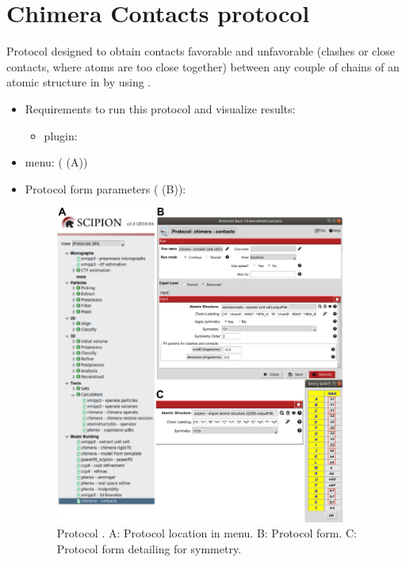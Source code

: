 \section{Chimera Contacts protocol}
\label{app:chimeraContactsProtocol}%

Protocol designed to obtain contacts favorable and unfavorable (clashes or close contacts, where atoms are too close together) between any couple of chains of an atomic structure in \scipion by using \chimera. 

 \begin{itemize}
  \item Requirements to run this protocol and visualize results:
    \begin{itemize}
        \item \scipion plugin: 
    \end{itemize}
  \item \scipion menu:
    ( (A))
  
  \item Protocol form parameters ( (B)):
  
  \begin{figure}[H]
     \centering 
     \captionsetup{width=.7\linewidth} 
     \includegraphics[width=0.90\textwidth]{Images_appendix/Fig155.pdf}
     \caption{Protocol . A: Protocol location in \scipion menu. B: Protocol form. C: Protocol form detailing  for  symmetry.}
     \label{fig:app_protocol_contacts_1}
    \end{figure}


\end{itemize}
